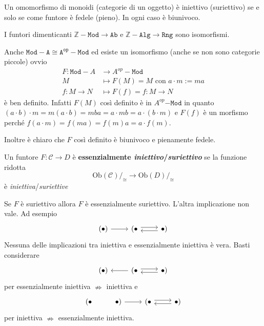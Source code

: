 \begin{example}{}
    Un omomorfismo di monoidi (categorie di un oggetto) è iniettivo (suriettivo)
    se e solo se come funtore è fedele (pieno). In ogni caso è biunivoco.
\end{example}

\begin{example}{}
    I funtori dimenticanti \(\mathtt{\mathbb{Z}-Mod} \to \mathtt{Ab}\) e \(\mathtt{\mathbb{Z}-Alg} \to \mathtt{Rng}\) sono isomorfismi.
\end{example}

\begin{example}{}
    Anche \(\mathtt{Mod-A}\cong \mathtt{A^{op}-Mod}\) ed esiste un isomorfismo
    (anche se non sono categorie piccole) ovvio 
    \begin{align*}
        F: \mathtt{Mod}-A &\longrightarrow A^{op}-\mathtt{Mod} \\
        M &\longmapsto F(M) = M \text{ con \(a \cdot m := ma\)} \\
        f : M \to N &\longmapsto F{(f)} = f : M \to N
    \end{align*}
    è ben definito. Infatti \(F{(M)}\) così definito è in
    \(A^{op}\mathtt{-Mod}\) in quanto \({(a \cdot b)} \cdot m = m {(a \cdot b)}
    = mba = a \cdot mb = a \cdot {(b \cdot m)}\) e \(F{(f)}\) è un morfismo
    perché \(f{(a \cdot m)} = f{(ma)} = f{(m)}a = a \cdot  f{(m)}\). 

    Inoltre è chiaro che \(F\) così definito è biunivoco e pienamente fedele.
\end{example}

\begin{definition}{}
    Un funtore \(F: \mathcal{C} \to D\) è \textbf{essenzialmente
    \emph{iniettivo}/\emph{suriettivo}} se la funzione ridotta 
    \[
        \mathrm{Ob}{(\mathcal{C})}/_{\cong} \to \mathrm{Ob}{(D)}/_{\cong}
    \]
    è \emph{iniettiva}/\emph{suriettive}
\end{definition}

\begin{remark}{}
    Se \(F\) è suriettivo allora \(F\) è essenzialmente suriettivo. L'altra
    implicazione non vale. Ad esempio
\[\begin{tikzcd}
	{(\bullet)} & {(\bullet} & {\bullet)}
	\arrow[from=1-1, to=1-2]
	\arrow[shift left, from=1-2, to=1-3]
	\arrow[shift left, from=1-3, to=1-2]
\end{tikzcd}\]
    Nessuna delle implicazioni tra iniettiva e essenzialmente iniettiva è vera.
    Basti considerare
\[\begin{tikzcd}
	{(\bullet)} & {(\bullet} & {\bullet)}
	\arrow[from=1-2, to=1-1]
	\arrow[shift left, from=1-2, to=1-3]
	\arrow[shift left, from=1-3, to=1-2]
\end{tikzcd}\]
    per essenzialmente iniettiva \(\nRightarrow\) iniettiva
    e
\[\begin{tikzcd}
	{(\bullet} & {\bullet)} & {(\bullet} & {\bullet)}
	\arrow[from=1-2, to=1-3]
	\arrow[shift left, from=1-3, to=1-4]
	\arrow[shift left, from=1-4, to=1-3]
\end{tikzcd}\]
    per iniettiva \(\nRightarrow\) essenzialmente iniettiva.
\end{remark}

